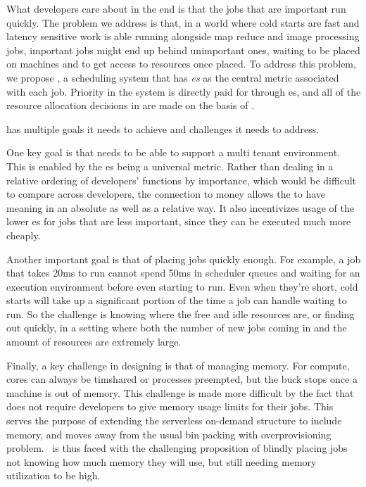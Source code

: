 
What developers care about in the end is that the jobs that are important run
quickly. The problem we address is that, in a world where cold starts are fast
and latency sensitive work is able running alongside map reduce and image
processing jobs, important jobs might end up behind unimportant ones, waiting to
be placed on machines and to get access to resources once placed. To address
this problem, we propose \sys{}, a scheduling system that has
\textit{\priceclass{}es} as the central metric associated with each job.
Priority in the system is directly paid for through \priceclass{}es, and all of
the resource allocation decisions in \sys{} are made on the basis of
\priceclass{}.

\Sys{} has multiple goals it needs to achieve and challenges it needs to
address.

One key goal is that \sys{} needs to be able to support a multi tenant
environment. This is enabled by the \priceclass{}es being a universal metric.
Rather than dealing in a relative ordering of developers' functions by
importance, which would be difficult to compare across developers, the
connection to money allows the \class{} to have meaning in an absolute as well
as a relative way. It also incentivizes usage of the lower \class{}es for jobs
that are less important, since they can be executed much more cheaply.


Another important goal is that of placing jobs quickly enough. For example, a
job that takes 20ms to run cannot spend 50ms in scheduler queues and waiting for
an execution environment before even starting to run. Even when they're short,
cold starts will take up a significant portion of the time a job can handle
waiting to run. So the challenge is knowing where the free and idle resources
are, or finding out quickly, in a setting where both the number of new jobs
coming in and the amount of resources are extremely large.


Finally, a key challenge in designing \sys{} is that of managing memory. For
compute, cores can always be timshared or processes preempted, but the buck
stops once a machine is out of memory. This challenge is made more difficult by
the fact that \sys{} does not require developers to give memory usage limits for
their jobs. This serves the purpose of extending the serverless on-demand
structure to include memory, and moves away from the usual bin packing with
overprovisioning problem.~\Sys{} is thus faced with the challenging proposition
of blindly placing jobs not knowing how much memory they will use, but still
needing memory utilization to be high.
 
